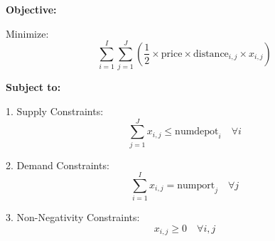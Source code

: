 \documentclass{article}
\begin{document}
\textbf{Objective:}

Minimize:
\[
\sum_{i=1}^{I} \sum_{j=1}^{J} \left( \frac{1}{2} \times \text{price} \times \text{distance}_{i,j} \times x_{i,j} \right)
\]

\textbf{Subject to:}

1. Supply Constraints:
\[
\sum_{j=1}^{J} x_{i,j} \leq \text{numdepot}_i \quad \forall i
\]

2. Demand Constraints:
\[
\sum_{i=1}^{I} x_{i,j} = \text{numport}_j \quad \forall j
\]

3. Non-Negativity Constraints:
\[
x_{i,j} \geq 0 \quad \forall i, j
\]
\end{document}
